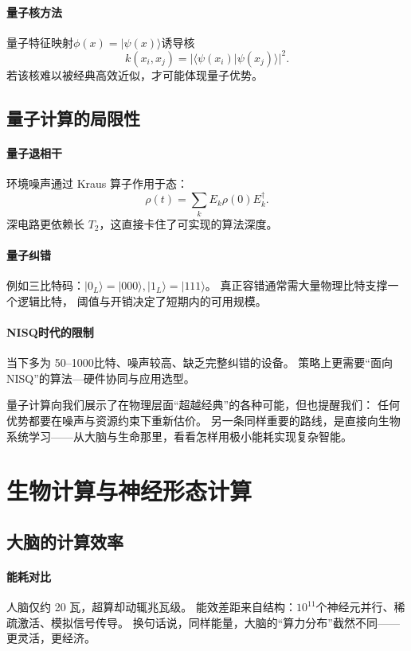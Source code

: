 \paragraph{量子核方法}
量子特征映射$\phi(x)=|\psi(x)\rangle$诱导核
$$k(x_i,x_j)=|\langle\psi(x_i)|\psi(x_j)\rangle|^2.$$
若该核难以被经典高效近似，才可能体现量子优势。

\subsection{量子计算的局限性}

\paragraph{量子退相干}
环境噪声通过 Kraus 算子作用于态：
$$\rho(t)=\sum_k E_k\rho(0)E_k^\dagger.$$
深电路更依赖长 $T_2$，这直接卡住了可实现的算法深度。

\paragraph{量子纠错}
例如三比特码：$|0_L\rangle=|000\rangle,|1_L\rangle=|111\rangle$。  
真正容错通常需大量物理比特支撑一个逻辑比特，  
阈值与开销决定了短期内的可用规模。

\paragraph{NISQ时代的限制}
当下多为 50--1000比特、噪声较高、缺乏完整纠错的设备。  
策略上更需要“面向NISQ”的算法—硬件协同与应用选型。

量子计算向我们展示了在物理层面“超越经典”的各种可能，但也提醒我们：  
任何优势都要在噪声与资源约束下重新估价。  
另一条同样重要的路线，是直接向生物系统学习——从大脑与生命那里，看看怎样用极小能耗实现复杂智能。

\section{生物计算与神经形态计算}

\subsection{大脑的计算效率}

\paragraph{能耗对比}
人脑仅约 20 瓦，超算却动辄兆瓦级。  
能效差距来自结构：$10^{11}$个神经元并行、稀疏激活、模拟信号传导。  
换句话说，同样能量，大脑的“算力分布”截然不同——更灵活，更经济。

